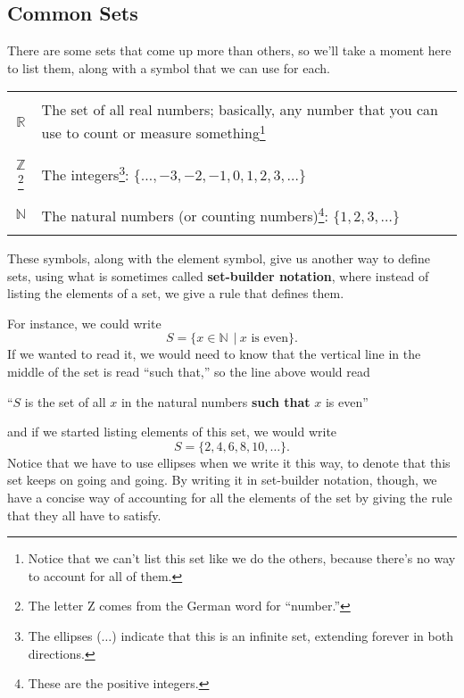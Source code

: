 \subsection{Common Sets}

There are some sets that come up more than others, so we'll take a moment here to list them, along with a symbol that we can use for each.
\begin{center}
\begin{tabularx}{3.5in}{|c | X|}
\hline
& \\
$\mathbb{R}$ & The set of all real numbers; basically, any number that you can use to count or measure something\footnote{Notice that we can't list this set like we do the others, because there's no way to account for all of them.}\\
& \\
\hline
& \\
$\mathbb{Z}$\footnote{The letter Z comes from the German word for ``number.''} & The integers\footnote{The ellipses ($\ldots$) indicate that this is an infinite set, extending forever in both directions.}: $\{\ldots, -3,-2,-1,0,1,2,3, \ldots\}$\\
& \\
\hline
& \\
$\mathbb{N}$ & The natural numbers (or counting numbers)\footnote{These are the positive integers.}: $\{1,2,3,\ldots\}$\\
& \\
\hline
\end{tabularx}
\end{center}

These symbols, along with the element symbol, give us another way to define sets, using what is sometimes called \textbf{set-builder notation}, where instead of listing the elements of a set, we give a rule that defines them.

For instance, we could write \[S = \{x \in \mathbb{N}\ \ |\ x \textrm{ is even}\}.\]  If we wanted to read it, we would need to know that the vertical line in the middle of the set is read ``such that,'' so the line above would read 
\begin{center}
``$S$ is the set of all $x$ in the natural numbers \textbf{such that} $x$ is even''
\end{center}
and if we started listing elements of this set, we would write \[S = \{2, 4, 6, 8, 10, \ldots\}.\]  Notice that we have to use ellipses when we write it this way, to denote that this set keeps on going and going.  By writing it in set-builder notation, though, we have a concise way of accounting for all the elements of the set by giving the rule that they all have to satisfy.

